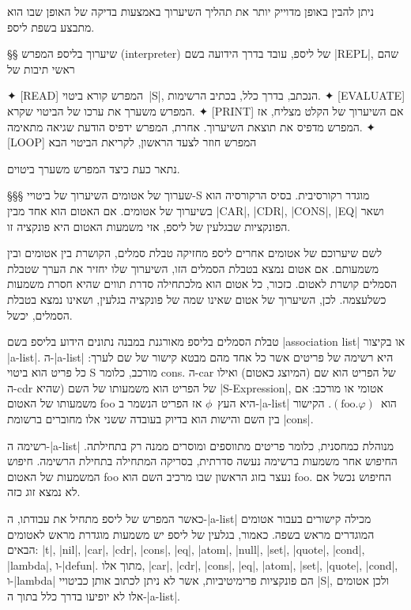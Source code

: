 ניתן להבין באופן מדוייק יותר את תהליך השיערוך באמצעות בדיקה של האופן שבו הוא
מתבצע בשפת ליספ.

§§ שיערוך בליספ
המפרש (interpreter) של ליספ, עובד בדרך הידועה בשם \E|REPL|, שהם ראשי תיבות של
\begin{description}
  ✦ [READ] המפרש קורא ביטוי~\E|S|, הנכתב, בדרך כלל, בכתיב הרשימות.
  ✦ [EVALUATE] המפרש משערך את ערכו של הביטוי שקרא.
  ✦ [PRINT] אם השיערוך של הקלט מצליח, אז המפרש מדפיס את תוצאת השיערוך. אחרת,
  המפרש ידפיס הודעת שגיאה מתאימה.
  ✦ [LOOP] המפרש חוזר לצעד הראשון, לקריאת הביטוי הבא
\end{description}

נתאר כעת כיצד המפרש משערך ביטוים.

§§§ שערוך של אטומים
השיערוך של ביטויי-S מוגדר רקורסיבית. בסיס הרקורסיה הוא בשיערוך של אטומים. אם
האטום הוא אחד מבין
\T|CAR|, \T|CDR|, \T|CONS|, \T|EQ| ושאר
הפונקציות שבגלעין של ליספ, אזי משמעות האטום
היא פונקציה זו.

לשם שיערוכם של אטומים אחרים ליספ מחזיקה טבלת סמלים, הקושרת בין אטומים ובין
משמעותם. אם אטום נמצא בטבלת הסמלים הזו, השיערוך שלו יחזיר את הערך שטבלת הסמלים
קושרת לאטום. כזכור, כל אטום הוא מלכתחילה סדרת תווים שהיא חסרת משמעות כשלעצמה.
לכן, השיערוך של אטום שאינו שמה של פונקציה בגלעין, ושאינו נמצא בטבלת הסמלים,
יכשל.

טבלת הסמלים בליספ מאורגנת במבנה נתונים הידוע בליספ בשם \E|association list| או
בקיצור \E|a-list|. ה-\E|a-list| היא רשימה של פריטים אשר כל אחד מהם מבטא קישור
של שם לערך: כל פריט הוא ביטוי S מורכב, כלומר cons. ה-car של הפריט הוא שם
(המיוצג כאטום) ואילו ה-cdr של הפריט הוא משמעותו של השם (שהיא \E|S-Expression|,
אטומי או מורכב: אם משמעותו של האטום foo היא העץ~$ϕ$ אז הפריט הנשמר ב-\E|a-list|
הוא~$(\text{foo}.φ)$. הקישור בין השם והישות הוא בדיוק בעובדה ששני אלו מחוברים
ברשומת \E|cons|.

רשימה ה-\E|a-list| מנוהלת כמחסנית, כלומר פריטים מתווספים ומוסרים ממנה רק
בתחילתה. החיפוש אחר משמעות ברשימה נעשה סדרתית, בסריקה המתחילה בתחילת הרשימה.
חיפוש המשמעות של האטום foo נעצר בזוג הראשון שבו מרכיב השם הוא foo. החיפוש נכשל
אם לא נמצא זוג כזה.

כאשר המפרש של ליספ מתחיל את עבודתו, ה-\E|a-list| מכילה קישורים בעבור אטומים
המוגדרים מראש בשפה.
כאמור, בגלעין של ליספ יש משמעות מוגדרת מראש לאטומים הבאים: \E|t|, \E|nil|,
\E|car|, \E|cdr|, \E|cons|, \E|eq|, \E|atom|, \E|null|, \E|set|, \E|quote|,
\E|cond|, \E|lambda|, ו-\E|defun|.
מתוך אלו, \E|car|, \E|cdr|, \E|cons|, \E|eq|, \E|atom|, \E|set|, \E|quote|,
\E|cond|, ו-\E|lambda| הם פונקציות פרימיטיביות, אשר לא ניתן לכתוב אותן כביטויי
\E|S|, ולכן אטומים אלו לא יופיעו בדרך כלל בתוך ה-\E|a-list|.

